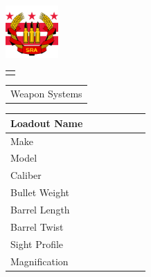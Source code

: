 \documentclass[8pt]{article}
\author{DC Metro Socialist Rifle Association}
\begin{document}
\begin{minipage}[t]{2cm} 
	\includegraphics[width=2cm, height=2cm]{DC.png}
	\begin{tabular}{p{1.5cm}|}
		\\
		\hline
		\\[5.5cm]
	\end{tabular}
\end{minipage}
\hfill
\begin{minipage}[t]{11cm}
	\begin{minipage}[t]{3cm}
		\begin{tabular}{ p{8cm} }			
			\huge Weapon Systems\\[1cm]			
		\end{tabular}
	\end{minipage}
		
	\begin{tabular}{ | p{1.5cm} | p{1cm} | p{1cm} | p{1cm} | p{1cm} | p{1cm} | p{1cm} |}
		\hline
		\tiny Loadout Name &  &  &  &  &  &  \\ [2mm]
		\hline
		\tiny Make &  &  &  &  &  &  \\ [2mm]
		\hline
		\tiny Model & & & & & & \\ [2mm]
		\hline
		\tiny Caliber & & & & & & \\ [2mm]
		\hline
		\tiny Bullet Weight & & & & & & \\ [2mm]
		\hline
		\tiny Barrel Length & & & & & & \\ [2mm]
		\hline
		\tiny Barrel Twist & & & & & & \\ [2mm]
		\hline
		\tiny Sight Profile & & & & & & \\ [2mm]
		\hline
		\tiny Magnification & & & & & & \\ [2mm]
		\hline
	\end{tabular}
\end{minipage}
\end{document}
